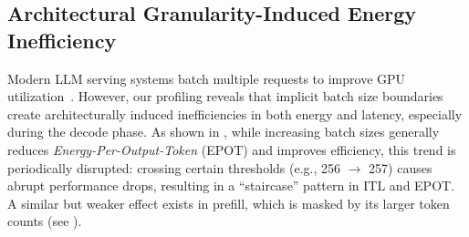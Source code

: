 \subsection{Architectural Granularity-Induced Energy Inefficiency}
\label{subsec:tile-effect}



Modern LLM serving systems batch multiple requests to improve GPU utilization~\cite{yu2022orca}.
However, our profiling reveals that implicit batch size boundaries create architecturally induced inefficiencies in both energy and latency, especially during the decode phase.
As shown in , while increasing batch sizes generally reduces \textit{Energy-Per-Output-Token} (EPOT) and improves efficiency, this trend is periodically disrupted: crossing certain thresholds (e.g., 256 $\rightarrow$ 257) causes abrupt performance drops, resulting in a ``staircase'' pattern in ITL and EPOT.
A similar but weaker effect exists in prefill, which is masked by its larger token counts (see ).


